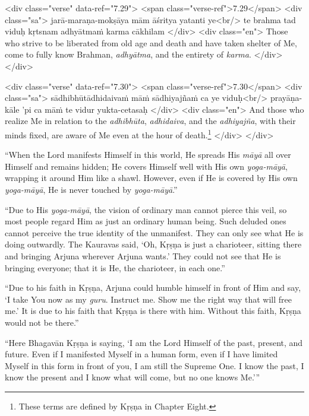 \begin{html}
<div class="verse" data-ref="7.29">
  <span class="verse-ref">7.29</span>
  <div class="sa">
    jarā-maraṇa-mokṣāya mām āśritya yatanti ye<br/>
    te brahma tad viduḥ kṛtsnam adhyātmaṁ karma cākhilam
  </div>
  <div class="en">
    Those who strive to be liberated from old age and death and have taken shelter of Me, come to fully know Brahman, \textit{adhyātma}, and the entirety of \textit{karma}.
  </div>
</div>
\end{html}



\begin{html}
<div class="verse" data-ref="7.30">
  <span class="verse-ref">7.30</span>
  <div class="sa">
    sādhibhūtādhidaivaṁ māṁ sādhiyajñaṁ ca ye viduḥ<br/>
    prayāṇa-kāle ’pi ca māṁ te vidur yukta-cetasaḥ
  </div>
  <div class="en">
    And those who realize Me in relation to the \textit{adhibhūta}, \textit{adhidaiva}, and the \textit{adhiyajña}, with their minds fixed, are aware of Me even at the hour of death.\footnote{These terms are defined by Kṛṣṇa in Chapter Eight.}
  </div>
</div>
\end{html}


\enquote{When the Lord manifests Himself in this world, He spreads His \textit{māyā} all over Himself and remains hidden; He covers Himself well with His own \textit{yoga-māyā}, wrapping it around Him like a shawl. However, even if He is covered by His own \textit{yoga-māyā}, He is never touched by \textit{yoga-māyā}.}

\enquote{Due to His \textit{yoga-māyā}, the vision of ordinary man cannot pierce this veil, so most people regard Him as just an ordinary human being. Such deluded ones cannot perceive the true identity of the unmanifest. They can only see what He is doing outwardly. The Kauravas said, \enquote{Oh, Kṛṣṇa is just a charioteer, sitting there and bringing Arjuna wherever Arjuna wants.} They could not see that He is bringing everyone; that it is He, the charioteer, in each one.}

\enquote{Due to his faith in Kṛṣṇa, Arjuna could humble himself in front of Him and say, \enquote{I take You now as my \textit{guru}. Instruct me. Show me the right way that will free me.} It is due to his faith that Kṛṣṇa is there with him. Without this faith, Kṛṣṇa would not be there.}

\enquote{Here Bhagavān Kṛṣṇa is saying, \enquote{I am the Lord Himself of the past, present, and future. Even if I manifested Myself in a human form, even if I have limited Myself in this form in front of you, I am still the Supreme One. I know the past, I know the present and I know what will come, but no one knows Me.}}

